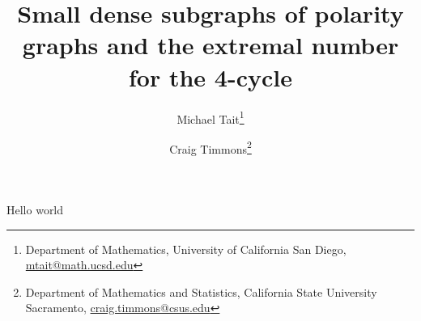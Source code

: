 \documentclass[12pt]{article}
\title{Small dense subgraphs of polarity graphs and the extremal number for the 4-cycle}
\author{
    Michael Tait\thanks{Department of Mathematics, University of California San Diego, \url{mtait@math.ucsd.edu}}
    \and
    Craig Timmons\thanks{Department of Mathematics and Statistics, California State University Sacramento, \mbox{\url{craig.timmons@csus.edu}}}
}
\date{}
\begin{document}
Hello world
\end{document}
